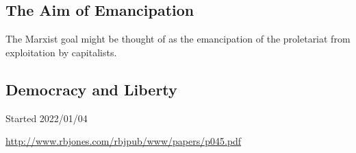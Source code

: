 \documentclass[10pt,titlepage]{article}
\begin{document}
\subsection{The Aim of Emancipation}

The Marxist goal might be thought of as the emancipation of the proletariat from exploitation by capitalists.



\subsection{Democracy and Liberty}



{}





\tiny{
Started 2022/01/04


\href{http://www.rbjones.com/rbjpub/www/papers/p045.pdf}{http://www.rbjones.com/rbjpub/www/papers/p045.pdf}

}%
\end{document}
